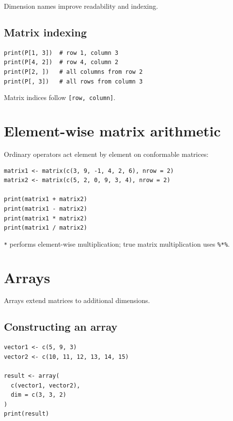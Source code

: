 Dimension names improve readability and indexing.

\subsection{Matrix indexing}

\begin{lstlisting}[style=dsr]
print(P[1, 3])  # row 1, column 3
print(P[4, 2])  # row 4, column 2
print(P[2, ])   # all columns from row 2
print(P[, 3])   # all rows from column 3
\end{lstlisting}

Matrix indices follow \texttt{[row, column]}.

\section{Element-wise matrix arithmetic}

Ordinary operators act element by element on conformable matrices:

\begin{lstlisting}[style=dsr]
matrix1 <- matrix(c(3, 9, -1, 4, 2, 6), nrow = 2)
matrix2 <- matrix(c(5, 2, 0, 9, 3, 4), nrow = 2)

print(matrix1 + matrix2)
print(matrix1 - matrix2)
print(matrix1 * matrix2)
print(matrix1 / matrix2)
\end{lstlisting}

\begin{keyidea}
\texttt{*} performs element-wise multiplication; true matrix multiplication uses \texttt{\%*\%}.
\end{keyidea}

\section{Arrays}

Arrays extend matrices to additional dimensions.

\subsection{Constructing an array}

\begin{lstlisting}[style=dsr]
vector1 <- c(5, 9, 3)
vector2 <- c(10, 11, 12, 13, 14, 15)

result <- array(
  c(vector1, vector2),
  dim = c(3, 3, 2)
)
print(result)
\end{lstlisting}

